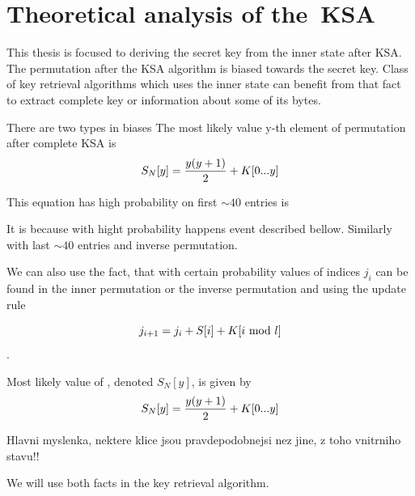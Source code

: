 \chapter{Theoretical analysis of the~KSA}

This thesis is focused to deriving the secret key from the inner state after KSA. The permutation after the KSA algorithm is biased towards the secret key. Class of key retrieval algorithms which uses the inner state can benefit from that fact to extract complete key or information about some of its bytes. 

There are two types in biases The most likely value y-th element of permutation after complete KSA is
\\


\[ S_{N}[y] = \dfrac{y(y+1)}{2} + K[{0}...{y}]\]

 This equation has high probability on  first $ \sim 40 $ entries is

 It is because with hight probability happens event  described bellow. Similarly with last $ \sim 40 $ entries and inverse permutation. 

We can also use the fact, that with certain probability values of indices $ j_{i} $ can be found in the inner permutation or the inverse permutation and using the update rule

\[ j_{i+1} = j_{i} + S[i] + K[i\ \text{mod}\ l] \].




Most likely value of , denoted $ S_{N}[y] $, is given by 
\[ S_{N}[y] = \dfrac{y(y+1)}{2} + K[{0}...{y}] \]


Hlavni myslenka, nektere klice jsou pravdepodobnejsi nez jine, z toho vnitrniho stavu!! 

We will use both facts in the key retrieval algorithm.








